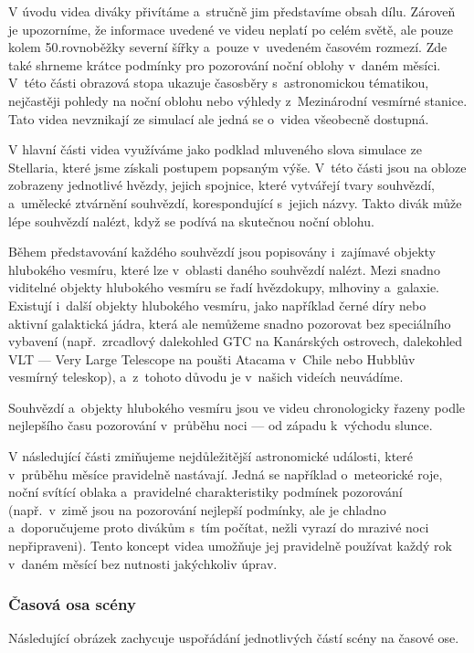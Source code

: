 \documentclass[12pt,a4paper,titlepage]{article}
\begin{document}
V úvodu videa diváky přivítáme a~stručně jim představíme obsah dílu. Zároveň je upozorníme, že informace uvedené ve videu neplatí po celém světě, ale pouze kolem 50.\@ rovnoběžky severní šířky a~pouze v~uvedeném časovém rozmezí. Zde také shrneme krátce podmínky pro pozorování noční oblohy v~daném měsíci. V~této části obrazová stopa ukazuje časosběry s~astronomickou tématikou, nejčastěji pohledy na noční oblohu nebo výhledy z~Mezinárodní vesmírné stanice. Tato videa nevznikají ze simulací ale jedná se o~videa všeobecně dostupná.

V hlavní části videa využíváme jako podklad mluveného slova simulace ze Stellaria, které jsme získali postupem popsaným výše. V~této části jsou na obloze zobrazeny jednotlivé hvězdy, jejich spojnice, které vytvářejí tvary souhvězdí, a~umělecké ztvárnění souhvězdí, korespondující s~jejich názvy. Takto divák může lépe souhvězdí nalézt, když se podívá na skutečnou noční oblohu. 

Během představování každého souhvězdí jsou popisovány i~zajímavé objekty hlubokého vesmíru, které lze v~oblasti daného souhvězdí nalézt. Mezi snadno viditelné objekty hlubokého vesmíru se řadí hvězdokupy, mlhoviny a~galaxie. Existují i~další objekty hlubokého vesmíru, jako například černé díry nebo aktivní galaktická jádra, která ale nemůžeme snadno pozorovat bez speciálního vybavení (např.\ zrcadlový dalekohled GTC na Kanárských ostrovech, dalekohled VLT --- Very Large Telescope na poušti Atacama v~Chile nebo Hubblův vesmírný teleskop), a~z~tohoto důvodu je v~našich videích neuvádíme.

Souhvězdí a~objekty hlubokého vesmíru jsou ve videu chronologicky řazeny podle nejlepšího času pozorování v~průběhu noci --- od západu k~východu slunce. 

V následující části zmiňujeme nejdůležitější astronomické události, které v~průběhu měsíce pravidelně nastávají. Jedná se například o~meteorické roje, noční svítící oblaka a~pravidelné charakteristiky podmínek pozorování (např.\ v~zimě jsou na pozorování nejlepší podmínky, ale je chladno a~doporučujeme proto divákům s~tím počítat, nežli vyrazí do mrazivé noci nepřipraveni). Tento koncept videa umožňuje jej pravidelně používat každý rok v~daném měsící bez nutnosti jakýchkoliv úprav.

\subsubsection{Časová osa scény}\label{makingof:resolve:merging}
Následující obrázek zachycuje uspořádání jednotlivých částí scény na časové ose.
\end{document}
